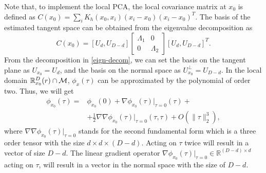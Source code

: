 \documentclass{article}
\theoremstyle{remark}
\begin{document}
Note that, to implement the local PCA, the local covariance matrix at $x_0$ is defined as $C(x_0) = \sum_i K_h(x_0,x_i) (x_i-x_0)(x_i-x_0)^T$. The basis of the estimated tangent space can be obtained from the eigenvalue decomposition as
\begin{equation}\label{eign-decom}
C(x_0) = [U_d , U_{D-d}] 
\left[
\begin{array}{cc}
\Lambda_1& 0\\
0 & \Lambda_2
\end{array}\right]
 [U_d , U_{D-d}]^T.
\end{equation}
From the decomposition in \eqref{eign-decom}, we can set the basis on the tangent plane as $U_{x_0} = U_d$, and the basis on the normal space as $U_{x_0}^\perp = U_{D-d}$. In the local domain ${\mathbb R}_{x_0}^D (r)\cap \cal M$,  $\phi_x(\tau)$ can be approximated by the polynomial of order two. Thus, we will get
\begin{equation}\label{app_phi}
\begin{aligned}
\phi_{x_0}(\tau) =& \phi_{x_0}(0)+ \nabla {\phi_{x_0}}(\tau)|_{\tau=0}(\tau)+ \\
&+\frac{1}{2}{\nabla\nabla\phi_{x_0}(\tau)|_{\tau=0}}(\tau, \tau)+O(\|\tau\|_2^3),
\end{aligned}
\end{equation}
where ${\nabla\nabla\phi_{x_0}(\tau)|_{\tau=0}}$ stands for the second fundamental form which is a three order tensor with the size $ d\times d\times (D-d)$. Acting on $\tau$ twice will result in a vector of size $D-d$.  The linear gradient operator  $\nabla {\phi_{x_0}}(\tau)|_{\tau=0}\in \mathbb{R}^{{(D-d)}\times d}$ acting on $\tau$, will result in a vector in the normal space with the size of $D-d$.
\end{document}
